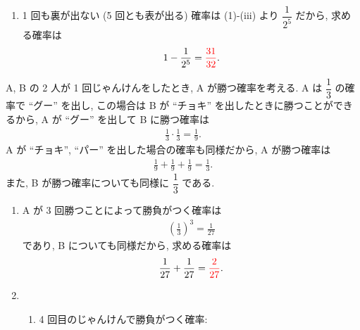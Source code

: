 \begin{qenumerate}
{\begin{enumerate}
{				 回以上表が出る事象を $A$ と表す.
				$A$ の余事象 $\overline{A}$ は ``表が出る回数が 2 回以下'' であり, これは ``裏が 3 回以上出る'' と同値である.
				硬貨を投げて表が出る確率と裏が出る確率は等しいから, $A$ の確率と $\overline{A}$ の確率は等しい.
				以上より
				\begin{align}
					\begin{cases}
						P(A) + P\left(\overline{A}\right) = 1 \\
						P(A) = P\left(\overline{A}\right)
					\end{cases}
					\quad\Leftrightarrow\quad
					P(A) = P\left(\overline{A}\right) = \frac{1}{2}.
				\end{align}
				すなわち, 求める確率は $\red{\dfrac{1}{2}}$.
			}
			\item{
				1 回も裏が出ない (5 回とも表が出る) 確率は (1)-(iii) より $\dfrac{1}{2^{5}}$ だから, 求める確率は
				\begin{align}
					1 - \frac{1}{2^{5}} = \textcolor{red}{\frac{31}{32}}.
				\end{align}
			}
		\end{enumerate}
	}
	\item{
		A, B の 2 人が 1 回じゃんけんをしたとき, A が勝つ確率を考える.
		A は $\dfrac{1}{3}$ の確率で ``グー'' を出し, この場合は B が ``チョキ'' を出したときに勝つことができるから, A が ``グー'' を出して B に勝つ確率は
		\begin{align}
			\frac{1}{3}\cdot\frac{1}{3} = \frac{1}{9}.
		\end{align}
		A が ``チョキ'', ``パー'' を出した場合の確率も同様だから, A が勝つ確率は
		\begin{align}
			\frac{1}{9} + \frac{1}{9} + \frac{1}{9} = \frac{1}{3}.
		\end{align}
		また, B が勝つ確率についても同様に $\dfrac{1}{3}$ である.
		\begin{enumerate}
			\item{
				A が 3 回勝つことによって勝負がつく確率は
				\begin{align}
					\left(\frac{1}{3}\right)^{3} = \frac{1}{27}
				\end{align}
				であり, B についても同様だから, 求める確率は
				\begin{align}
					\frac{1}{27} + \frac{1}{27} = \textcolor{red}{\frac{2}{27}}.
				\end{align}
			}
			\item{
				\begin{enumerate}
					\item{
						4 回目のじゃんけんで勝負がつく確率: \\
}
\end{enumerate}}
\end{enumerate}}
\end{qenumerate}
